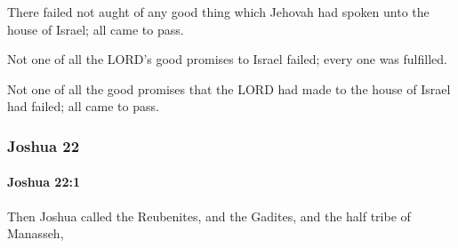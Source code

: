 			\begin{versebox}
					\item[BHS] 
					\item[ASV] There failed not aught of any good thing which Jehovah had spoken unto the house of Israel; all came to pass.
					\item[NIV] Not one of all the LORD’s good promises to Israel failed; every one was fulfilled.
					\item[NRSV] Not one of all the good promises that the LORD had made to the house of Israel had failed; all came to pass.
			\end{versebox}
	\subsubsection{Joshua 22} %
		\label{JOSHUA-22}

		\paragraph{Joshua 22:1} %
			\label{JOSHUA-22-1}

			Then Joshua called the Reubenites, and the Gadites, and the half tribe of Manasseh,

